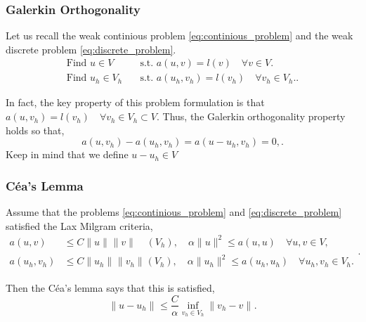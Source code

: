 \subsubsection{Galerkin Orthogonality}%
\label{ssub:galerkin_orthonality}

Let us recall the weak continious problem \eqref{eq:continious_problem} and the weak discrete problem \eqref{eq:discrete_problem}.
\begin{align}
    \label{eq:continious_problem}
    \text{Find } u \in V \quad&  \text{s.t. } a\left( u,v \right) = l\left( v \right)  \quad \forall v \in V. \\
    \label{eq:discrete_problem}
    \text{Find } u_h \in V_h \quad&  \text{s.t. } a\left( u_h,v_h \right) = l\left( v_h \right)  \quad \forall v_h \in V_h.
.\end{align}

In fact, the key property of this problem formulation is that $a\left( u, v_{h} \right)  = l \left( v_{h} \right) \quad  \forall v_{h} \in V_{h} \subset V  $. Thus, the Galerkin orthogonality property holds so that,
$$
a\left( u, v_{h} \right)  - a\left( u_{h}, v_{h} \right) = a\left( u- u_{h}, v_{h} \right) = 0,   . $$
Keep in mind that we define
$ u - u_{h} \in V$
\subsubsection{Céa's Lemma }%
\label{ssub:ceas_lemma}

Assume that the problems \eqref{eq:continious_problem} and \eqref{eq:discrete_problem} satisfied the Lax Milgram criteria,
\begin{equation*}
    \begin{split}
a\left( u,v \right)  & \le C \| u \|_{  }^{  }  \| v \|_{  }^{  }  \quad   \left( V_{h} \right) , \quad  \alpha \|  u\|_{   }^{     2} \le a \left( u,u \right) \quad \forall u,v\in V, \\
a\left( u_{h},v_{h} \right)  & \le C \| u_{h} \|_{  }^{  }  \| v_{h} \|_{  }^{  }   \left( V_{h} \right) , \quad  \alpha \| u_{h}\|_{   }^{     2} \le a \left( u_{h},u_{h} \right)\quad  \forall u_{h},v_{h}\in V_{h}.
    \end{split}
.\end{equation*}

Then the Céa's lemma says that this is satisfied,
\begin{equation}
\label{eq:Ceas_lemma_continious}
\| u - u_{h} \|_{  }^{  } \le \frac{C}{\alpha }  \inf_{v_{h} \in V_{h}} \| v_{h} - v \|_{  }^{  } .
\end{equation}

